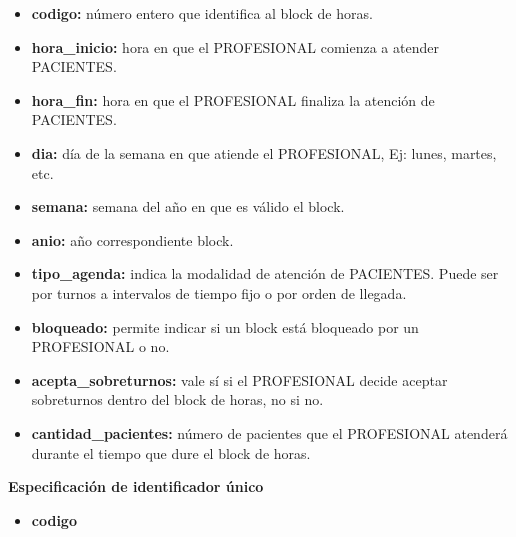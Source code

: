 \documentclass[a4paper,11pt]{article}
\begin{document}
\begin{itemize}

    \item \textbf{codigo:} número entero que identifica al block de horas.

     \item \textbf{hora\_inicio:} hora en que el PROFESIONAL comienza a atender PACIENTES.

     \item \textbf{hora\_fin:} hora en que el PROFESIONAL finaliza la atención de PACIENTES.

     \item \textbf{dia:} día de la semana en que atiende el PROFESIONAL, Ej: lunes, martes, etc.

     \item \textbf{semana:} semana del año en que es válido el block.

	 \item \textbf{anio:} año correspondiente block.
	 
     \item \textbf{tipo\_agenda:} indica la modalidad de atención de PACIENTES. Puede ser por 
     turnos a intervalos de tiempo fijo o por orden de llegada.

     \item \textbf{bloqueado:} permite indicar si un block está bloqueado por un PROFESIONAL o no.

     \item \textbf{acepta\_sobreturnos:} vale sí si el PROFESIONAL decide aceptar sobreturnos dentro 
     del block de horas, no si no.

     \item \textbf{cantidad\_pacientes:} número de pacientes que el PROFESIONAL atenderá
     durante el tiempo que dure el block de horas.

\end{itemize}

\textbf{Especificación de identificador único}

\begin{itemize}







	\item \textbf{codigo}

\end{itemize}
\end{document}
